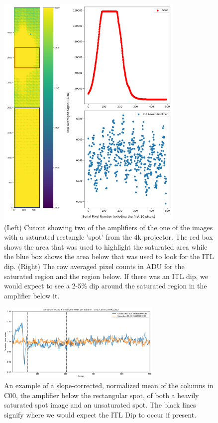 \begin{figure}[ht]
\centering
\includegraphics[width=0.8\textwidth]{figures/RectangleCutout.png}
\caption{(Left) Cutout showing two of the amplifiers of the one of the images with a saturated rectangle 'spot' from the 4k projector. The red box shows the area that was used to highlight the saturated area while the  blue box shows the area below that was used to look for the ITL dip. (Right) The row averaged pixel counts in ADU for the saturated region and the region below. If there was an ITL dip, we would expect to see a 2-5\% dip around the saturated region in the amplifier below it.}
\label{fig:ITLDip_Rectangle}
\end{figure}

\begin{figure}[ht]
\centering
\includegraphics[width=0.7\textwidth]{figures/Slope-CorrectedNormalizedMeanperColumn_ampC00CCDR42_S12.png}
\caption{An example of a slope-corrected, normalized mean of the columns in C00, the amplifier below the rectangular spot, of both a heavily saturated spot image and an unsaturated spot. The black lines signify where we would expect the ITL Dip to occur if present.}
\label{fig:ITLDip_Yassine}
\end{figure}

